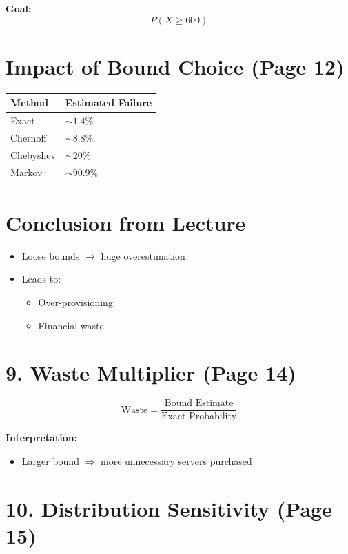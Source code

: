 \documentclass{article}
\begin{document}
\textbf{Goal:}
\[P(X \ge 600)\]

\section*{Impact of Bound Choice (Page 12)}

\begin{tabular}{ll}
\toprule
\textbf{Method} & \textbf{Estimated Failure} \\
\midrule
Exact & $\sim 1.4\%$ \\
Chernoff & $\sim 8.8\%$ \\
Chebyshev & $\sim 20\%$ \\
Markov & $\sim 90.9\%$ \\
\bottomrule
\end{tabular}

\section*{Conclusion from Lecture}

\begin{itemize}
    \item Loose bounds $\rightarrow$ huge overestimation
    \item Leads to:
    \begin{itemize}
        \item Over-provisioning
        \item Financial waste
    \end{itemize}
\end{itemize}

\section*{9. Waste Multiplier (Page 14)}

\[
\text{Waste} = \frac{\text{Bound Estimate}}{\text{Exact Probability}}
\]

\textbf{Interpretation:}
\begin{itemize}
    \item Larger bound $\Rightarrow$ more unnecessary servers purchased
\end{itemize}

\section*{10. Distribution Sensitivity (Page 15)}
\end{document}
